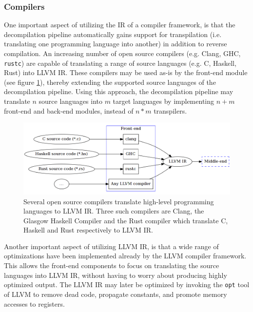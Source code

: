 
\subsubsection{Compilers}
\label{sec:compilers}


One important aspect of utilizing the IR of a compiler framework, is that the decompilation pipeline automatically gains support for transpilation (i.e. translating one programming language into another) in addition to reverse compilation. An increasing number of open source compilers (e.g. Clang, GHC, \texttt{rustc}) are capable of translating a range of source languages (e.g. C, Haskell, Rust) into LLVM IR. These compilers may be used as-is by the front-end module (see figure \ref{fig:front-end_source}), thereby extending the supported source languages of the decompilation pipeline. Using this approach, the decompilation pipeline may translate $ n $ source languages into $ m $ target languages by implementing $ n + m $ front-end and back-end modules, instead of $ n * m $ transpilers.

\begin{figure}[htbp]
	\begin{center}
		\includegraphics[width=\textwidth]{inc/front-end_source.png}
		\caption{Several open source compilers translate high-level programming languages to LLVM IR. Three such compilers are Clang, the Glasgow Haskell Compiler and the Rust compiler which translate C, Haskell and Rust respectively to LLVM IR.}
		\label{fig:front-end_source}
	\end{center}
\end{figure}

Another important aspect of utilizing LLVM IR, is that a wide range of optimizations have been implemented already by the LLVM compiler framework. This allows the front-end components to focus on translating the source languages into LLVM IR, without having to worry about producing highly optimized output. The LLVM IR may later be optimized by invoking the \texttt{opt} tool of LLVM to remove dead code, propagate constants, and promote memory accesses to registers.
